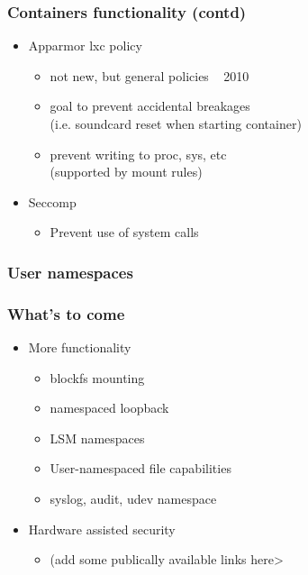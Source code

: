 \documentclass{beamer}
\begin{document}
\begin{frame}
\frametitle{Containers functionality (contd)}
\begin{itemize}
\item Apparmor lxc policy
  \begin{itemize}
  \item not new, but general policies ~ 2010
  \item  goal to prevent accidental breakages \\
  (i.e. soundcard reset when starting container)
  \item prevent writing to proc, sys, etc \\
  (supported by mount rules)
  \end{itemize}
\item Seccomp
  \begin{itemize}
  \item Prevent use of system calls
  \end{itemize}
\end{itemize}

\end{frame}

\begin{frame}
\frametitle{User namespaces}
\end{frame}


\begin{frame}
\frametitle{What's to come}
\begin{itemize}
\item More functionality
  \begin{itemize}
  \item blockfs mounting
  \item namespaced loopback
  \item LSM namespaces
  \item User-namespaced file capabilities
  \item syslog, audit, udev namespace
  \end{itemize}

\item Hardware assisted security
  \begin{itemize}
  \item (add some publically available links here>
  \end{itemize}
\end{itemize}

\end{frame}



\end{document}
